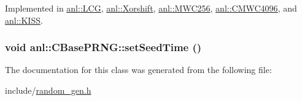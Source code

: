 Implemented in \hyperlink{classanl_1_1LCG_a671261ff641cf73b5929b3ab0d19fe37}{anl::LCG}, \hyperlink{classanl_1_1Xorshift_a0fd07695b4ac9d214db30ce5f896f958}{anl::Xorshift}, \hyperlink{classanl_1_1MWC256_a21991854d1538735f7f47746c5277697}{anl::MWC256}, \hyperlink{classanl_1_1CMWC4096_a6bac258bda47aff87e640cae6145c970}{anl::CMWC4096}, and \hyperlink{classanl_1_1KISS_a975aa76ee0371fc8da9afae199192e04}{anl::KISS}.\hypertarget{classanl_1_1CBasePRNG_a23758173ff6c4d248d9b619896e9a049}{
\subsubsection[{setSeedTime}]{\setlength{\rightskip}{0pt plus 5cm}void anl::CBasePRNG::setSeedTime ()}}
\label{classanl_1_1CBasePRNG_a23758173ff6c4d248d9b619896e9a049}


The documentation for this class was generated from the following file:\begin{DoxyCompactItemize}
\item 
include/\hyperlink{random__gen_8h}{random\_\-gen.h}\end{DoxyCompactItemize}

